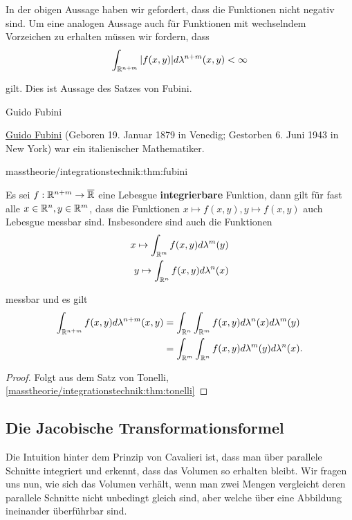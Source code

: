 \par
In der obigen Aussage haben wir gefordert, dass die Funktionen nicht negativ sind. Um eine analogen Aussage auch für Funktionen mit wechselndem Vorzeichen zu erhalten müssen wir fordern, dass
\begin{align*}
\int_{\mathbb{R}^{n+m}} \vert f(x,y) \vert d\lambda^{n+m}(x,y) <\infty
\end{align*}
\par
gilt. Dies ist Aussage des Satzes von Fubini.

\begin{emphBox}{Guido Fubini}{}

\par
\href{https://de.wikipedia.org/wiki/Guido\_Fubini}{Guido Fubini} (Geboren 19. Januar 1879 in Venedig; Gestorben 6. Juni 1943 in New York) war ein italienischer Mathematiker.
\end{emphBox}
\begin{theorem}{}{masstheorie/integrationstechnik:thm:fubini}



\par
Es sei \(f:\mathbb{R}^{n+m}\to \overline{\mathbb{R}}\) eine Lebesgue \textbf{integrierbare} Funktion, dann gilt für fast alle \(x\in\mathbb{R}^n,y\in\mathbb{R}^m\), dass die Funktionen \(x\mapsto f(x,y), y\mapsto f(x,y)\) auch Lebesgue messbar sind. Insbesondere sind auch die Funktionen
\begin{align*}
x \mapsto \int_{\mathbb{R}^m} f(x,y) d\lambda^m(y)\\
y \mapsto \int_{\mathbb{R}^n} f(x,y) d\lambda^n(x)
\end{align*}
\par
messbar und es gilt
\begin{align*}
\int_{\mathbb{R}^{n+m}} f(x,y) d\lambda^{n+m}(x,y) &= \int_{\mathbb{R}^n}\int_{\mathbb{R}^m} f(x,y) d\lambda^{n}(x)d\lambda^m(y)\\
&=
\int_{\mathbb{R}^m}\int_{\mathbb{R}^n} f(x,y) d\lambda^{m}(y)d\lambda^n(x).
\end{align*}\end{theorem}

\begin{proof}
 Folgt aus dem Satz von Tonelli, \cref{masstheorie/integrationstechnik:thm:tonelli} 
\end{proof}


\subsection{Die Jacobische Transformationsformel}
\label{\detokenize{masstheorie/integrationstechnik:die-jacobische-transformationsformel}}
\par
Die Intuition hinter dem Prinzip von Cavalieri ist, dass man über parallele Schnitte integriert und erkennt, dass das Volumen so erhalten bleibt. Wir fragen uns nun, wie sich das Volumen verhält, wenn man zwei Mengen vergleicht deren parallele Schnitte nicht unbedingt gleich sind, aber welche über eine Abbildung ineinander überführbar sind.

